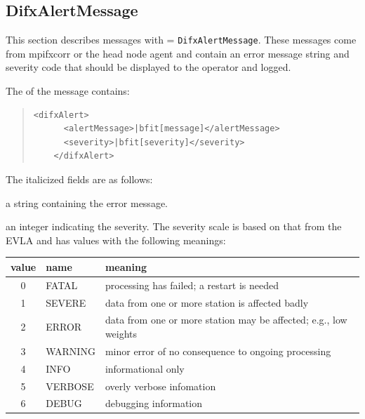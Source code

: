 
\subsection{DifxAlertMessage} \label{sec:difxalertmessage}

This section describes messages with  = {\tt DifxAlertMessage}.
These messages come from mpifxcorr or the head node agent and contain an error message string and severity code that should be displayed to the operator and logged.

The  of the message contains:

\begin{quotation}
\begin{Verbatim}[commandchars=\|\[\]]
    <difxAlert>
      <alertMessage>|bfit[message]</alertMessage>
      <severity>|bfit[severity]</severity>
    </difxAlert>
\end{Verbatim}
\end{quotation}


\noindent The italicized fields are as follows:

\begin{description}
\item{} a string containing the error message.
\item{} an integer indicating the severity. 
The severity scale is based on that from the EVLA and has values with the following meanings:

\begin{tabular}{cll}
value    & name & meaning \\
\hline
0 & FATAL   & processing has failed; a restart is needed  \\
1 & SEVERE  & data from one or more station is affected badly \\
2 & ERROR   & data from one or more station may be affected; e.g., low weights \\
3 & WARNING & minor error of no consequence to ongoing processing \\
4 & INFO    & informational only \\
5 & VERBOSE & overly verbose infomation \\
6 & DEBUG   & debugging information 
\end{tabular}

\end{description}






